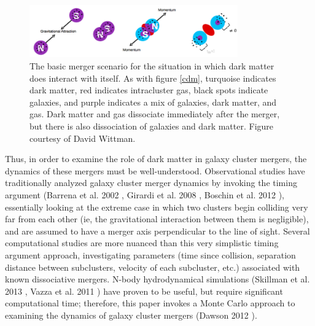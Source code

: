 \documentclass[12 pt]{article}
\renewcommand{\baselinestretch}{2}
\begin{document}
\renewcommand{\baselinestretch}{1}
\begin{figure}[h]
\caption{The basic merger scenario for the situation in which dark matter does interact with itself. As with figure \ref{cdm}, turquoise indicates dark matter, red indicates intracluster gas, black spots indicate galaxies, and purple indicates a mix of galaxies, dark matter, and gas. Dark matter and gas dissociate immediately after the merger, but there is also dissociation of galaxies and dark matter. Figure courtesy of David Wittman.}
\label{sidm}
\centering
\includegraphics[width=0.8\textwidth]{sidm}
\end{figure}
\renewcommand{\baselinestretch}{2}

Thus, in order to examine the role of dark matter in galaxy cluster mergers, the dynamics of these mergers must be well-understood. Observational studies have traditionally analyzed galaxy cluster merger dynamics by invoking the timing argument (Barrena et al. 2002 \cite{Barrena02}, Girardi et al. 2008 \cite{Girardi08}, Boschin et al. 2012 \cite{Boschin12}), essentially looking at the extreme case in which two clusters begin colliding very far from each other (ie, the gravitational interaction between them is negligible), and are assumed to have a merger axis perpendicular to the line of sight. Several computational studies are more nuanced than this very simplistic timing argument approach, investigating parameters (time since collision, separation distance between subclusters, velocity of each subcluster, etc.) associated with known dissociative mergers. N-body hydrodynamical simulations (Skillman et al. 2013 \cite{Skillman13}, Vazza et al. 2011 \cite{Vazza11}) have proven to be useful, but require significant computational time; therefore, this paper invokes a Monte Carlo approach to examining the dynamics of galaxy cluster mergers (Dawson 2012 \cite{Dawson13}).
\end{document}
